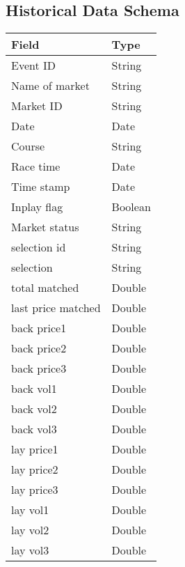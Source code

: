 \begin{appendices}
		
	
		
	\chapter{Historical Data Schema}
		\label{appendix:historicalDataSchema}	
		\begin{table}[h]
			\centering
			\begin{tabular}{ll}
				Field 				& Type \\
				\toprule					
				Event ID				& String\\
				Name of market		& String\\
				Market ID			& String\\
				Date					& Date\\
				Course				& String\\
				Race time			& Date\\
				Time stamp			& Date\\
				Inplay flag			& Boolean\\
				Market status		& String\\
				selection id			& String\\
				selection			& String\\
				total matched		& Double\\
				last price matched	& Double\\
				back price1			& Double\\
				back price2			& Double\\
				back price3			& Double\\
				back vol1			& Double\\
				back vol2			& Double\\
				back vol3			& Double\\
				lay price1			& Double\\
				lay price2			& Double\\
				lay price3			& Double\\
				lay vol1				& Double\\
				lay vol2				& Double\\
				lay vol3				& Double\\
			\end{tabular}
		\end{table}
	\begin{landscape}

\end{landscape}
\end{appendices}
